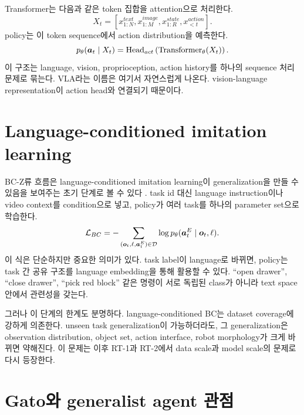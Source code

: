 Transformer는 다음과 같은 token 집합을 attention으로 처리한다.
\begin{equation}
  X_t
  =
  [
  x^{text}_{1:N},
  x^{image}_{1:M},
  x^{state}_{1:R},
  x^{action}_{<t}
  ].
  \label{eq:robot-transformer-tokens}
\end{equation}
policy는 이 token sequence에서 action distribution을 예측한다.
\begin{equation}
  p_{\theta}(\bm{a}_t \mid X_t)
  =
  \mathrm{Head}_{act}
  \left(
  \mathrm{Transformer}_{\theta}(X_t)
  \right).
  \label{eq:robotics-transformer-action-head}
\end{equation}
이 구조는 language, vision, proprioception, action history를 하나의 sequence 처리 문제로 묶는다. VLA라는 이름은 여기서 자연스럽게 나온다. vision-language representation이 action head와 연결되기 때문이다.

\section{Language-conditioned imitation learning}

BC-Z류 흐름은 language-conditioned imitation learning이 generalization을 만들 수 있음을 보여주는 초기 단계로 볼 수 있다 \cite{bcz2022}. task id 대신 language instruction이나 video context를 condition으로 넣고, policy가 여러 task를 하나의 parameter set으로 학습한다.
\begin{equation}
  \mathcal{L}_{BC}
  =
  -
  \sum_{(\bm{o}_t,\ell,\bm{a}_t^{E})\in\mathcal{D}}
  \log
  p_{\theta}(\bm{a}_t^{E}\mid \bm{o}_t,\ell).
  \label{eq:language-bc-loss}
\end{equation}
이 식은 단순하지만 중요한 의미가 있다. task label이 language로 바뀌면, policy는 task 간 공유 구조를 language embedding을 통해 활용할 수 있다. ``open drawer'', ``close drawer'', ``pick red block'' 같은 명령이 서로 독립된 class가 아니라 text space 안에서 관련성을 갖는다.

그러나 이 단계의 한계도 분명하다. language-conditioned BC는 dataset coverage에 강하게 의존한다. unseen task generalization이 가능하더라도, 그 generalization은 observation distribution, object set, action interface, robot morphology가 크게 바뀌면 약해진다. 이 문제는 이후 RT-1과 RT-2에서 data scale과 model scale의 문제로 다시 등장한다.

\section{Gato와 generalist agent 관점}

